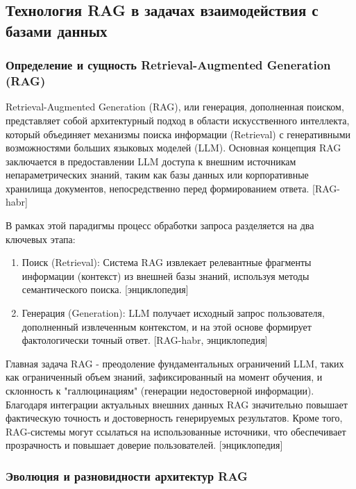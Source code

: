 \subsection{Технология RAG в задачах взаимодействия с базами данных}

\subsubsection{Определение и сущность Retrieval-Augmented Generation (RAG)}

Retrieval-Augmented Generation (RAG), или генерация, дополненная поиском, представляет собой архитектурный подход в области искусственного интеллекта, который объединяет механизмы поиска информации (Retrieval) с генеративными возможностями больших языковых моделей (LLM). Основная концепция RAG заключается в предоставлении LLM доступа к внешним источникам непараметрических знаний, таким как базы данных или корпоративные хранилища документов, непосредственно перед формированием ответа. [RAG-habr]

В рамках этой парадигмы процесс обработки запроса разделяется на два ключевых этапа:

\begin{enumerate}
    \item Поиск (Retrieval): Система RAG извлекает релевантные фрагменты информации (контекст) из внешней базы знаний, используя методы семантического поиска. [энциклопедия]
    \item Генерация (Generation): LLM получает исходный запрос пользователя, дополненный извлеченным контекстом, и на этой основе формирует фактологически точный ответ. [RAG-habr, энциклопедия]
\end{enumerate}

Главная задача RAG - преодоление фундаментальных ограничений LLM, таких как ограниченный объем знаний, зафиксированный на момент обучения, и склонность к "галлюцинациям" (генерации недостоверной информации). Благодаря интеграции актуальных внешних данных RAG значительно повышает фактическую точность и достоверность генерируемых результатов. Кроме того, RAG-системы могут ссылаться на использованные источники, что обеспечивает прозрачность и повышает доверие пользователей. [энциклопедия]

\subsubsection{Эволюция и разновидности архитектур RAG}

